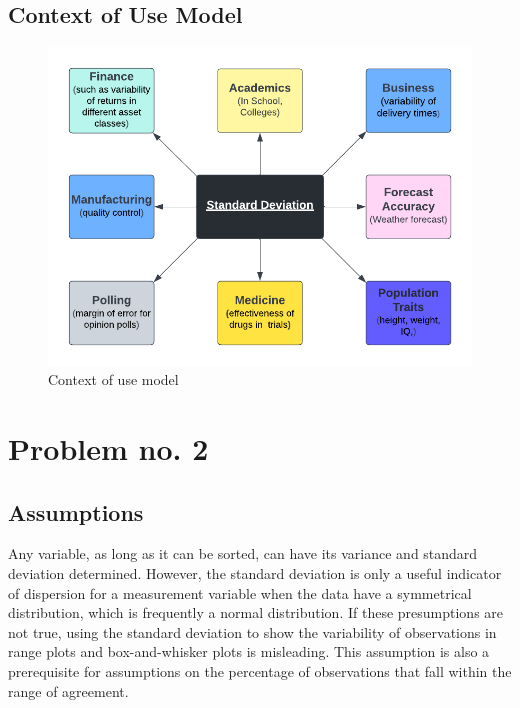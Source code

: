 \documentclass[12pt,a4paper]{report}
\begin{document}
\section{Context of Use Model}
\begin{figure}[h]
    \centering
    \includegraphics{Images/Context-of-use.png}
    \caption{Context of use model}
    \label{fig:Context of use model image}
\end{figure}

\chapter{Problem no. 2}
\section{Assumptions}
Any variable, as long as it can be sorted, can have its variance and standard deviation determined. However, the standard deviation is only a useful indicator of dispersion for a measurement variable when the data have a symmetrical distribution, which is frequently a normal distribution. If these presumptions are not true, using the standard deviation to show the variability of observations in range plots and box-and-whisker plots is misleading. This assumption is also a prerequisite for assumptions on the percentage of observations that fall within the range of agreement.
\end{document}
